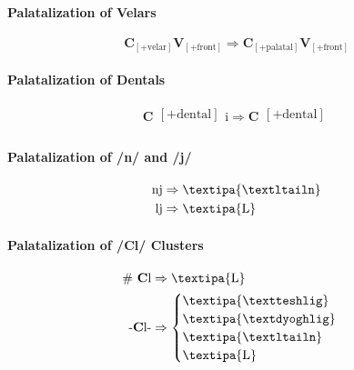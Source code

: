\documentclass{report}
\begin{document}
\paragraph{Palatalization of Velars}

\begin{equation}
  \textbf{C}_{[+\text{velar}]}\textbf{V}_{[+\text{front}]} \Rightarrow \textbf{C}_{[+\text{palatal}]}\textbf{V}_{[+\text{front}]}
\end{equation}


\paragraph{Palatalization of Dentals}

\begin{equation}
  \textbf{C}\substack{[+\text{dental}] \\ [+\text{stop}]}\text{i} \Rightarrow \textbf{C}\substack{[+\text{dental}] \\ [+\text{affricate}]}
\end{equation}

\paragraph{Palatalization of /n/ and /j/}

\begin{align}
  \text{nj} & \Rightarrow \text{\textipa{\textltailn}} \\
  \text{lj} & \Rightarrow \text{\textipa{L}}
\end{align}

\paragraph{Palatalization of /Cl/ Clusters}

\begin{align}
  \#\ \textbf{C}\text{l} & \Rightarrow \text{\textipa{L}} \\
  \text{-}\textbf{C}\text{l-} & \Rightarrow \begin{cases}
                                              \text{\textipa{\textteshlig}} \\
                                              \text{\textipa{\textdyoghlig}} \\
                                              \text{\textipa{\textltailn}} \\
                                              \text{\textipa{L}}
                                            \end{cases}
\end{align}
\end{document}
